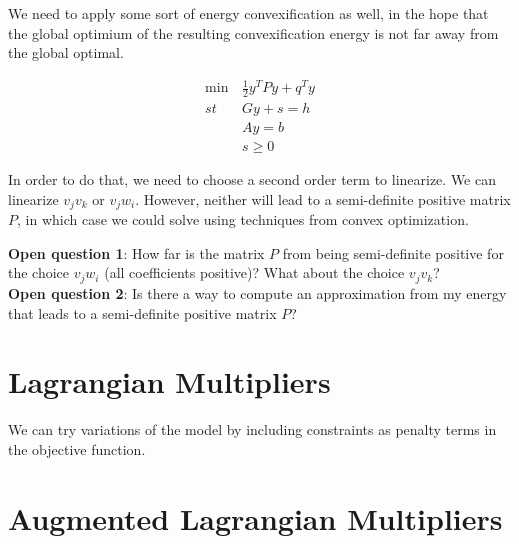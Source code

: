 We need to apply some sort of energy convexification as well, in the hope that the global optimium of the resulting convexification energy is not far away from the global optimal.
	
	\begin{equation}
	\begin{aligned}
		\min &\frac{1}{2} y^TPy + q^Ty\\
		st \quad &Gy + s = h\\
		&Ay = b \\
		& s \geq 0
		\label{eq:quadratic-formulation}
	\end{aligned}
	\end{equation}
	
	In order to do that, we need to choose a second order term to linearize. We can linearize $v_jv_k$ or $v_jw_i$. However, neither will lead to a semi-definite positive matrix $P$, in which case we could solve using techniques from convex optimization.

	\textbf{Open question 1}: How far is the matrix $P$ from being semi-definite positive for the choice $v_jw_i$ (all coefficients positive)? What about the choice $v_jv_k$? \\
		
	\textbf{Open question 2}: Is there a way to compute an approximation from my energy that leads to a semi-definite positive matrix $P$?
	
	
\section{Lagrangian Multipliers}

	We can try variations of the model by including constraints as penalty terms in the objective function.
	
	
\section{Augmented Lagrangian Multipliers}	

